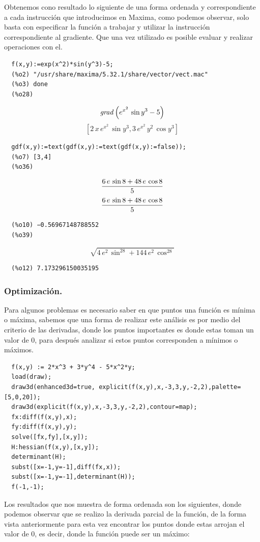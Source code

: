 \documentclass[12pt]{article}
\begin{document}
  Obtenemos cono resultado lo siguiente de una forma ordenada y correspondiente a cada instrucción que introducimos en Maxima, como podemos observar, solo basta con especificar la función a trabajar y utilizar la instrucción correspondiente al gradiente. Que una vez utilizado es posible evaluar y realizar operaciones con el.
  \begin{verbatim}
  f(x,y):=exp(x^2)*sin(y^3)-5;
  (%o2) "/usr/share/maxima/5.32.1/share/vector/vect.mac"
  (%o3) done
  (%o28)
  \end{verbatim}
  $${\it grad}\left(e^{x^2}\,\sin y^3-5\right)$$
  $$\left[ 2\,x\,e^{x^2}\,\sin y^3 , 3\,e^{x^2}\,y^2\,\cos y^3 \right] $$
  \begin{verbatim}
  gdf(x,y):=text(gdf(x,y):=text(gdf(x,y):=false));
  (%o7) [3,4]
  (%o36)
  \end{verbatim}
  $${{6\,e\,\sin 8+48\,e\,\cos 8}\over{5}}$$
  $${{6\,e\,\sin 8+48\,e\,\cos 8}\over{5}}$$
  \begin{verbatim}
  (%o10) −0.56967148788552
  (%o39)
  \end{verbatim}
  $$\sqrt{4\,e^2\,\sin ^28+144\,e^2\,\cos ^28}$$
  \begin{verbatim}
  (%o12) 7.173296150035195
  \end{verbatim}
  
  \subsubsection*{Optimización.}
  
  Para algunos problemas es necesario saber en que puntos una función es mínima o máxima, sabemos que una forma de realizar este análisis es por medio del criterio de las derivadas, donde los puntos importantes es donde estas toman un valor de 0, para después analizar si estos puntos corresponden a mínimos o máximos.
  \begin{verbatim}
  f(x,y) := 2*x^3 + 3*y^4 - 5*x^2*y;
  load(draw);
  draw3d(enhanced3d=true, explicit(f(x,y),x,-3,3,y,-2,2),palette=[5,0,20]);
  draw3d(explicit(f(x,y),x,-3,3,y,-2,2),contour=map);
  fx:diff(f(x,y),x);
  fy:diff(f(x,y),y);
  solve([fx,fy],[x,y]);
  H:hessian(f(x,y),[x,y]);
  determinant(H);
  subst([x=-1,y=-1],diff(fx,x));
  subst([x=-1,y=-1],determinant(H));
  f(-1,-1);
  \end{verbatim}
  
Los resultados que nos muestra de forma ordenada son los siguientes, donde podemos observar que se realizo la derivada parcial de la función, de la forma vista anteriormente para esta vez encontrar los puntos donde estas arrojan el valor de 0, es decir, donde la función puede ser un máximo:
  
\end{document}
